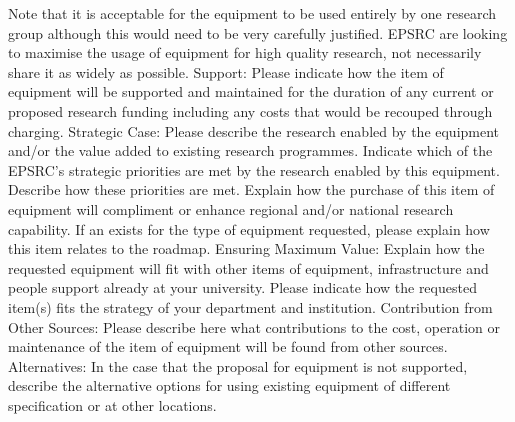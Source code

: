 Note that it is acceptable for the equipment to be used entirely by one research group although this would need to be very carefully justified. EPSRC are looking to maximise the usage of equipment for high quality research, not necessarily share it as widely as possible.
Support: Please indicate how the item of equipment will be supported and maintained for the duration of any current or proposed research funding including any costs that would be recouped through charging.
Strategic Case: Please describe the research enabled by the equipment and/or the value added to existing research programmes. Indicate which of the EPSRC's strategic priorities are met by the research enabled by this equipment. Describe how these priorities are met. Explain how the purchase of this item of equipment will compliment or enhance regional and/or national research capability. If an
exists for the type of equipment requested, please explain how this item relates to the roadmap.
Ensuring Maximum Value: Explain how the requested equipment will fit with other items of equipment, infrastructure and people support already at your university. Please indicate how the requested item(s) fits the strategy of your department and institution.
Contribution from Other Sources: Please describe here what contributions to the cost, operation or maintenance of the item of equipment will be found from other sources.
Alternatives: In the case that the proposal for equipment is not supported, describe the alternative options for using existing equipment of different specification or at other locations.
